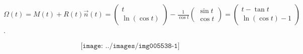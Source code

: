 {{\begin{center}
$\Omega(t)=M(t)+R(t)\overrightarrow{n}(t)=\left(
\begin{array}{c}
t\\
\ln(\cos t)
\end{array}
\right)-\frac{1}{\cos t}\left(
\begin{array}{c}
\sin t\\
\cos t
\end{array}
\right)=\left(
\begin{array}{c}
t-\tan t\\
\ln(\cos t)-1
\end{array}
\right)$.
\end{center}

$$\texttt{[image: ../images/img005538-1]}$$
}
}
